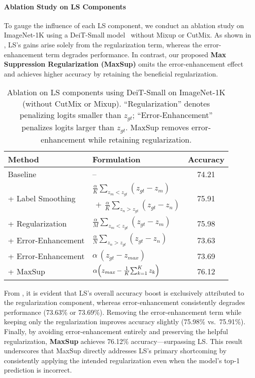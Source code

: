 \paragraph{Ablation Study on LS Components} To gauge the influence of each LS component, we conduct an ablation study on ImageNet-1K using a DeiT-Small model~\citep{touvron2021training} without Mixup or CutMix. As shown in , LS’s gains arise solely from the regularization term, whereas the error-enhancement term degrades performance. In contrast, our proposed \textbf{Max Suppression Regularization (MaxSup)} omits the error-enhancement effect and achieves higher accuracy by retaining the beneficial regularization.
\begin{table}[t]
\scriptsize
\centering
\caption{Ablation on LS components using DeiT-Small on ImageNet-1K (without CutMix or Mixup). 
``Regularization'' denotes penalizing logits smaller than \(z_{gt}\); 
``Error-Enhancement'' penalizes logits larger than \(z_{gt}\). 
MaxSup removes error-enhancement while retaining regularization.}
\label{tab:pre}
\begin{tabular}{@{}llc@{}}
\toprule
\textbf{Method} & \textbf{Formulation} & \textbf{Accuracy} \\
\midrule
Baseline & -- & 74.21 \\
\hline
\multirow{2}{*}{+ Label Smoothing}
  & \(\tfrac{\alpha}{K}\sum_{z_m<z_{gt}}(z_{gt}-z_m)\)
  & \multirow{2}{*}{75.91} \\
& \(\,+\, \tfrac{\alpha}{K}\sum_{z_n>z_{gt}}(z_{gt}-z_n)\) & \\
+ Regularization 
  & \(\tfrac{\alpha}{M}\sum_{z_m<z_{gt}}(z_{gt}-z_m)\) 
  & 75.98 \\
\textcolor{customgray}{+ Error-Enhancement} 
  & \textcolor{customgray}{\(\tfrac{\alpha}{N}\sum_{z_n>z_{gt}}(z_{gt}-z_n)\)}
  & \textcolor{customgray}{73.63} \\
\textcolor{customgray}{+ Error-Enhancement} 
  & \textcolor{customgray}{\(\alpha\,(z_{gt}-z_{\textit{max}})\)}
  & \textcolor{customgray}{73.69} \\
\midrule
+ MaxSup 
  & \(\alpha\Bigl(z_{\textit{max}} - \tfrac{1}{K}\!\sum_{k=1}^K z_k\Bigr)\)
  & 76.12 \\
\bottomrule
\end{tabular}
\end{table}
From , it is evident that LS’s overall accuracy boost is exclusively attributed to the regularization component, whereas error-enhancement consistently degrades performance (73.63\% or 73.69\%). Removing the error-enhancement term while keeping only the regularization improves accuracy slightly (75.98\% vs.\ 75.91\%). Finally, by avoiding error-enhancement entirely and preserving the helpful regularization, \textbf{MaxSup} achieves 76.12\% accuracy—surpassing LS. This result underscores that MaxSup directly addresses LS’s primary shortcoming by consistently applying the intended regularization even when the model’s top-1 prediction is incorrect.


